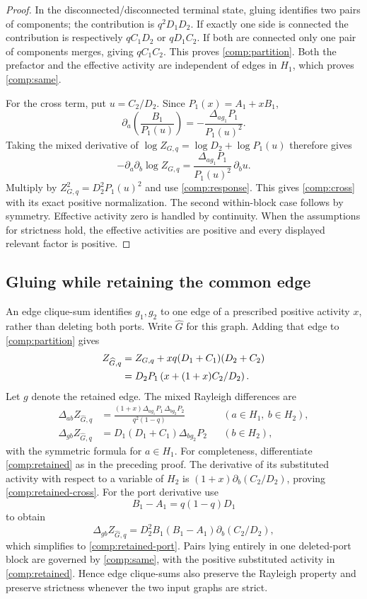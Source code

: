 \documentclass[11pt,a4paper]{article}
\theoremstyle{definition}
\theoremstyle{remark}\newtheorem{remark}[theorem]{Remark}
\begin{document}
\begin{proof}
In the disconnected/disconnected terminal state, gluing identifies two
pairs of components; the contribution is $q^2D_1D_2$. If exactly one
side is connected the contribution is respectively $qC_1D_2$ or
$qD_1C_2$. If both are connected only one pair of components merges,
giving $qC_1C_2$. This proves \eqref{comp:partition}.
Both the prefactor and the effective activity are independent of edges
in $H_1$, which proves \eqref{comp:same}.

For the cross term, put $u=C_2/D_2$. Since $P_1(x)=A_1+xB_1$,
\[
 \partial_a\!\left(\frac{B_1}{P_1(u)}\right)
 =-\frac{\Delta_{ag_1}P_1}{P_1(u)^2}.
\]
Taking the mixed derivative of
$\log Z_{G,q}=\log D_2+\log P_1(u)$ therefore gives
\[
 -\partial_a\partial_b\log Z_{G,q}
 =\frac{\Delta_{ag_1}P_1}{P_1(u)^2}\,\partial_bu.
\]
Multiply by $Z_{G,q}^2=D_2^2P_1(u)^2$ and use
\eqref{comp:response}. This gives \eqref{comp:cross} with its exact
positive normalization. The second within-block case follows by
symmetry. Effective activity zero is handled by continuity.
When the assumptions for strictness hold, the effective activities
are positive and every displayed relevant factor is positive.
\end{proof}

\subsection{Gluing while retaining the common edge}

An edge clique-sum identifies $g_1,g_2$ to one edge of a prescribed
positive activity $x$, rather than deleting both ports. Write
$\widehat G$ for this graph. Adding that edge to \eqref{comp:partition}
gives
\begin{align}
 Z_{\widehat G,q}
 &=Z_{G,q}+xq(D_1+C_1)(D_2+C_2)\notag\\
 &=D_2P_1\left(x+(1+x)C_2/D_2\right).
 \label{comp:retained}
\end{align}
Let $g$ denote the retained edge. The mixed Rayleigh differences are
\begin{align}
 \Delta_{ab}Z_{\widehat G,q}
 &=\frac{(1+x)\Delta_{ag_1}P_1\,\Delta_{bg_2}P_2}
 {q^2(1-q)}
 &&(a\in H_1,\ b\in H_2),\label{comp:retained-cross}\\
 \Delta_{gb}Z_{\widehat G,q}
 &=D_1(D_1+C_1)\Delta_{bg_2}P_2
 &&(b\in H_2),\label{comp:retained-port}
\end{align}
with the symmetric formula for $a\in H_1$.
For completeness, differentiate \eqref{comp:retained} as in the preceding
proof. The derivative of its substituted activity with respect to a
variable of $H_2$ is $(1+x)\partial_b(C_2/D_2)$, proving
\eqref{comp:retained-cross}. For the port derivative use
\[
 B_1-A_1=q(1-q)D_1
\]
to obtain
\[
 \Delta_{gb}Z_{\widehat G,q}
 =D_2^2 B_1(B_1-A_1)\partial_b(C_2/D_2),
\]
which simplifies to \eqref{comp:retained-port}.
Pairs lying entirely in one deleted-port block are governed by
\eqref{comp:same}, with the positive substituted activity in
\eqref{comp:retained}.
Hence edge clique-sums also preserve the Rayleigh property and preserve
strictness whenever the two input graphs are strict.
\end{document}
